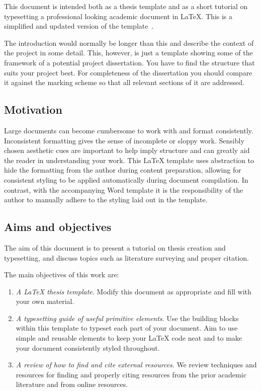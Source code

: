 \documentclass[12pt]{article}
\theoremstyle{plain}
\theoremstyle{definition}
\begin{document}
This document is intended both as a thesis template and as a short
tutorial on typesetting a professional looking academic document in
LaTeX. This is a simplified and updated version of the
template~\cite{custard-template}.

The introduction would normally be longer than this and describe the
context of the project in some detail. This, however, is just a
template showing some of the framework of a potential project
dissertation. You have to find the structure that suits your project
best. For completeness of the dissertation you should compare it
against the marking scheme so that all relevant sections of it are
addressed.

\subsection{Motivation}
\label{sec:intro_motivation} 

Large documents can become cumbersome to work with and format
consistently. Inconsistent formatting gives the sense of incomplete or
sloppy work. Sensibly chosen aesthetic cues are important to help
imply structure and can greatly aid the reader in understanding your
work. This LaTeX template uses abstraction to hide the formatting from
the author during content preparation, allowing for consistent styling
to be applied automatically during document compilation. In contrast,
with the accompanying Word template it is the responsibility of the
author to manually adhere to the styling laid out in the template.

\subsection{Aims and objectives}
\label{sec:intro_objective} 

The aim of this document is to present a tutorial on thesis creation and
typesetting, and discuss topics such as literature surveying and
proper citation.

The main objectives of this work are:

\begin{enumerate}
\item \emph{A LaTeX thesis template}. Modify this document as
  appropriate and fill with your own material.

\item \emph{A typesetting guide of useful primitive elements}. Use
  the building blocks within this template to typeset each part of
  your document. Aim to use simple and reusable elements to keep your
  LaTeX code neat and to make your document consistently styled
  throughout.

\item \emph{A review of how to find and cite external resources}. We
  review techniques and resources for finding and properly citing
  resources from the prior academic literature and from online
  resources.
\end{enumerate}
\end{document}
